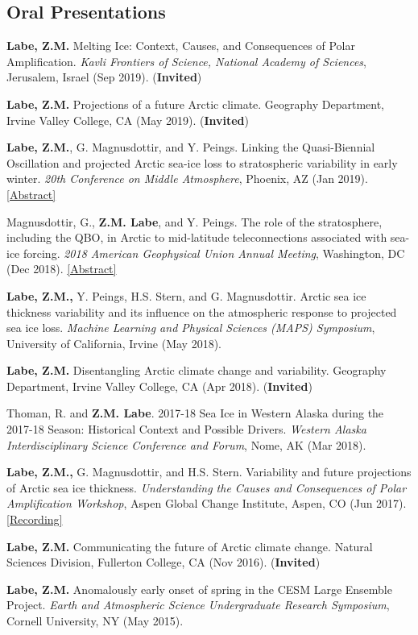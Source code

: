 \documentclass[margin,line,palatino,courier,10pt]{res}
\begin{document}
\begin{resume}
\section{\sc \textcolor{Cerulean}{\large{\textbf{Oral Presentations}}}}
\begin{etaremune}[leftmargin=0in,topsep=0in,parsep=0in]
\item \textbf{Labe, Z.M.} Melting Ice: Context, Causes, and Consequences of Polar Amplification. \textit{Kavli Frontiers of Science, National Academy of Sciences}, Jerusalem, Israel (Sep 2019). (\textbf{Invited})
\item \textbf{Labe, Z.M.} Projections of a future Arctic climate. Geography Department, Irvine Valley College, CA (May 2019). (\textbf{Invited})
\item \textbf{Labe, Z.M.}, G. Magnusdottir, and Y. Peings. Linking the Quasi-Biennial Oscillation and projected Arctic sea-ice loss to stratospheric variability in early winter. \textit{20th Conference on Middle Atmosphere}, Phoenix, AZ (Jan 2019). \href{https://ams.confex.com/ams/2019Annual/meetingapp.cgi/Paper/352664}{[Abstract]}
\item Magnusdottir, G., \textbf{Z.M. Labe}, and Y. Peings. The role of the stratosphere, including the QBO, in Arctic to mid-latitude teleconnections associated with sea-ice forcing. \textit{2018 American Geophysical Union Annual Meeting}, Washington, DC (Dec 2018). \href{https://agu.confex.com/agu/fm18/meetingapp.cgi/Paper/399117"}{[Abstract]}
\item \textbf{Labe, Z.M.,} Y. Peings, H.S. Stern, and G. Magnusdottir. Arctic sea ice thickness variability and its influence on the atmospheric response to projected sea ice loss. \textit{Machine Learning and Physical Sciences (MAPS) Symposium}, University of California, Irvine (May 2018). 
\item \textbf{Labe, Z.M.} Disentangling Arctic climate change and variability. Geography Department, Irvine Valley College, CA (Apr 2018). (\textbf{Invited})
\item Thoman, R. and \textbf{Z.M. Labe}. 2017-18 Sea Ice in Western Alaska during the 2017-18 Season: Historical Context and Possible Drivers. \textit{Western Alaska Interdisciplinary Science Conference and Forum}, Nome, AK (Mar 2018). 
\item \textbf{Labe, Z.M.,} G. Magnusdottir, and H.S. Stern. Variability and future projections of Arctic sea ice thickness. \textit{Understanding the Causes and Consequences of Polar Amplification Workshop}, Aspen Global Change Institute, Aspen, CO (Jun 2017). \href{https://www.agci.org/lib/17s1/variability-and-future-projections-arctic-sea-ice-thickness}{[Recording]}
\item \textbf{Labe, Z.M.} Communicating the future of Arctic climate change. Natural Sciences Division, Fullerton College, CA (Nov 2016). (\textbf{Invited})
\item \textbf{Labe, Z.M.} Anomalously early onset of spring in the CESM Large Ensemble Project. \textit{Earth and Atmospheric Science Undergraduate Research Symposium}, Cornell University, NY (May 2015). 


\end{etaremune}
\end{resume}
\end{document}
